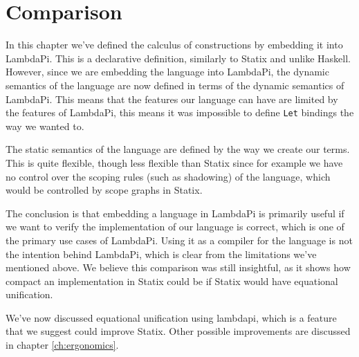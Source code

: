 \section{Comparison}

In this chapter we've defined the calculus of constructions by embedding it into LambdaPi. This is a declarative definition, similarly to Statix and unlike Haskell. However, since we are embedding the language into LambdaPi, the dynamic semantics of the language are now defined in terms of the dynamic semantics of LambdaPi. This means that the features our language can have are limited by the features of LambdaPi, this means it was impossible to define \verb|Let| bindings the way we wanted to.

The static semantics of the language are defined by the way we create our terms. This is quite flexible, though less flexible than Statix since for example we have no control over the scoping rules (such as shadowing) of the language, which would be controlled by scope graphs in Statix. 

The conclusion is that embedding a language in LambdaPi is primarily useful if we want to verify the implementation of our language is correct, which is one of the primary use cases of LambdaPi. Using it as a compiler for the language is not the intention behind LambdaPi, which is clear from the limitations we've mentioned above. We believe this comparison was still insightful, as it shows how compact an implementation in Statix could be if Statix would have equational unification.

We've now discussed equational unification using lambdapi, which is a feature that we suggest could improve Statix. Other possible improvements are discussed in chapter \ref{ch:ergonomics}.